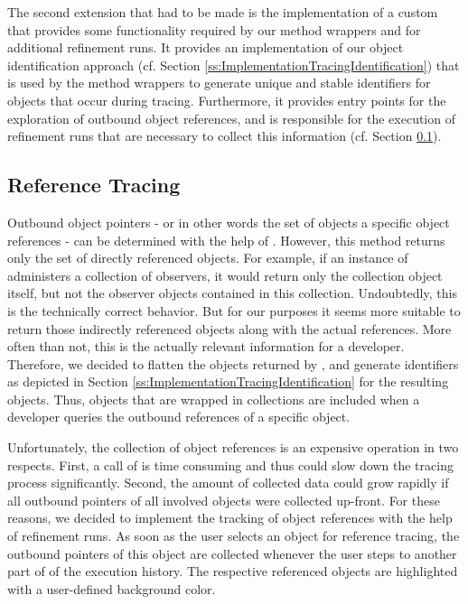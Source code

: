 The second extension that had to be made is the implementation of a custom  that provides some functionality required by our method wrappers and for additional refinement runs.
It provides an implementation of our object identification approach (cf. Section \ref{ss:ImplementationTracingIdentification}) that is used by the method wrappers to generate unique and stable identifiers for objects that occur during tracing.
Furthermore, it provides entry points for the exploration of outbound object references, and is responsible for the execution of refinement runs that are necessary to collect this information (cf. Section \ref{ss:ImplementationTracingReferences}).

\subsection{Reference Tracing}
\label{ss:ImplementationTracingReferences}
Outbound object pointers - or in other words the set of objects a specific object references - can be determined with the help of  .
However, this method returns only the set of directly referenced objects.
For example, if an instance of  administers a collection of observers, it would return only the collection object itself, but not the observer objects contained in this collection.
Undoubtedly, this is the technically correct behavior.
But for our purposes it seems more suitable to return those indirectly referenced objects along with the actual references. 
More often than not, this is the actually relevant information for a developer.
Therefore, we decided to flatten the objects returned by , and generate identifiers as depicted in Section \ref{ss:ImplementationTracingIdentification} for the resulting objects.
Thus, objects that are wrapped in collections are included when a developer queries the outbound references of a specific object.

Unfortunately, the collection of object references is an expensive operation in two respects.
First, a call of  is time consuming and thus could slow down the tracing process significantly.
Second, the amount of collected data could grow rapidly if all outbound pointers of all involved objects were collected up-front.
For these reasons, we decided to implement the tracking of object references with the help of refinement runs.
As soon as the user selects an object for reference tracing, the outbound pointers of this object are collected whenever the user steps to another part of of the execution history.
The respective referenced objects are highlighted with a user-defined background color.

